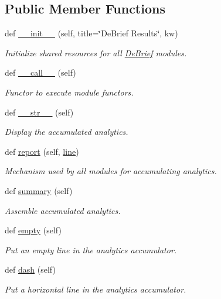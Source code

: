 \subsection*{Public Member Functions}
\begin{DoxyCompactItemize}
\item 
def \hyperlink{classc_1_1_de_brief_1_1_de_brief_ae66c45d45597942bc0853319a64b8273}{\+\_\+\+\_\+init\+\_\+\+\_\+} (self, title=\char`\"{}De\+Brief Results\char`\"{}, kw)
\begin{DoxyCompactList}\small\item\em Initialize shared resources for all \hyperlink{classc_1_1_de_brief_1_1_de_brief}{De\+Brief} modules. \end{DoxyCompactList}\item 
def \hyperlink{classc_1_1_de_brief_1_1_de_brief_ac723c58ba13bd4b52336e5dd047581e1}{\+\_\+\+\_\+call\+\_\+\+\_\+} (self)
\begin{DoxyCompactList}\small\item\em Functor to execute module functors. \end{DoxyCompactList}\item 
def \hyperlink{classc_1_1_de_brief_1_1_de_brief_ab0a283d7aed66574ee320844ca2e1cfa}{\+\_\+\+\_\+str\+\_\+\+\_\+} (self)
\begin{DoxyCompactList}\small\item\em Display the accumulated analytics. \end{DoxyCompactList}\item 
def \hyperlink{classc_1_1_de_brief_1_1_de_brief_acc4c0719d3ddf7060afaf84667c702c4}{report} (self, \hyperlink{classc_1_1_de_brief_1_1_de_brief_ab5fbcfb2eed0334f1c700df98856515c}{line})
\begin{DoxyCompactList}\small\item\em Mechanism used by all modules for accumulating analytics. \end{DoxyCompactList}\item 
def \hyperlink{classc_1_1_de_brief_1_1_de_brief_a9fc39f8add3a4233a20ab9246e385354}{summary} (self)
\begin{DoxyCompactList}\small\item\em Assemble accumulated analytics. \end{DoxyCompactList}\item 
def \hyperlink{classc_1_1_de_brief_1_1_de_brief_aa17666354bdd7236997d346330a95c5a}{empty} (self)
\begin{DoxyCompactList}\small\item\em Put an empty line in the analytics accumulator. \end{DoxyCompactList}\item 
def \hyperlink{classc_1_1_de_brief_1_1_de_brief_a5dc5bbc6ab177f82fc5d682b672e5843}{dash} (self)
\begin{DoxyCompactList}\small\item\em Put a horizontal line in the analytics accumulator. \end{DoxyCompactList}\end{DoxyCompactItemize}
